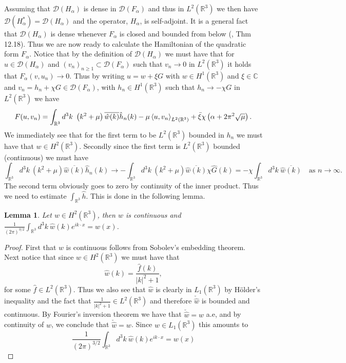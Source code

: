 \documentclass[a4paper,11pt]{article}
\newcommand{\dom}[1]{\mathscr D\left(#1\right)}
\newcommand{\R}{\mathbb{R}}
\newcommand{\C}{\mathbb{C}}
\newtheorem{lemma}{Lemma}
\numberwithin{equation}{section}
\begin{document}
Assuming that $ \dom{H_\alpha} $ is dense in $ \dom{F_\alpha} $ and thus in $ L^2(\R^3) $ we then have $ \dom{H_\alpha^*}=\dom{H_\alpha} $ and the operator, $ H_\alpha $, is self-adjoint. It is a general fact that $ \dom{H_\alpha} $ is dense whenever $ F_\alpha $ is closed and bounded from below (\cite{grubb2008distributions}, Thm 12.18). Thus we are now ready to calculate the Hamiltonian of the quadratic form $ F_\alpha $. Notice that by the definition of $ \dom{H_\alpha} $ we must have that for $ u\in\dom{H_\alpha} $ and $  (v_n)_{n\geq1}\subset\dom{F_\alpha} $  such that $ v_n\to0 $ in $ L^2(\R^3) $ it holds that  $ F_\alpha(v,u_n)\to 0 $. Thus by writing $ u=w+\xi G $ with $ w\in H^1(\R^3) $ and $ \xi\in\C $ and $ v_n=h_n+\chi G\in\dom{F_\alpha} $, with $ h_n\in H^1(\R^3) $ such that $ h_n\to-\chi G $ in $ L^2(\R^3) $ we have \begin{equation}
F(u,v_n)=\int_{\R^3} d^3k\ \left(k^2+\mu\right)\overline{\hat{w}(k)}\hat{h}_n(k)-\mu\braket{u,v_n}_{L^2(\R^3)}+\bar{\xi}\chi\left(\alpha+2\pi^2\sqrt{\mu}\right).
\end{equation}
We immediately see that for the first term to be $ L^2(\R^3) $ bounded in $ h_n $ we must have that $ w\in H^2(\R^3) $. Secondly since the first term is $ L^2(\R^3) $ bounded (continuous) we must have \begin{equation}
\int_{\R^3} d^3k\ \left(k^2+\mu\right)\overline{\hat{w}(k)}\hat{h}_n(k)\to-\int_{\R^3} d^3k\ \left(k^2+\mu\right)\overline{\hat{w}(k)}\chi \hat{G}(k)=-\chi\int_{\R^3} d^3k\ \overline{\hat{w}(k)}\quad \text{as }n\to\infty.
\end{equation} 
The second term obviously goes to zero by continuity of the inner product. Thus we need to estimate $ \int_{\R^3}\hat{h} $. This is done in the following lemma.
\begin{lemma}
	Let $ w\in H^2(\R^3) $, then $ w $ is continuous and $ \frac{1}{(2\pi)^{3/2}}\int_{\R^3}d^3k\ \hat{w}(k)e^{ik\cdot x}=w(x) $.
\end{lemma}
\begin{proof}
	First that $ w $ is continuous follows from Sobolev's embedding theorem. Next notice that since $ w\in H^2(\R^3) $ we must have that \begin{equation}
	\hat{w}(k)=\frac{\hat{f}(k)}{|k|^2+1},
	\end{equation}
	for some $ \hat{f}\in L^2(\R^3) $. Thus we also see that $ \hat{w} $ is clearly in $ L_1(\R^3) $ by H\"older's inequality and the fact that $ \frac{1}{|k|^2+1}\in L^2(\R^3) $ and therefore $ \check{\hat{w}} $ is bounded and continuous. By Fourier's inversion theorem we have that $ \check{\hat{w}}=w $ a.e, and by continuity of $ w $, we conclude that $ \check{\hat{w}}=w $. Since $ \hat{w}\in L_1(\R^3) $ this amounts to \begin{equation}
	\frac{1}{(2\pi)^{3/2}}\int_{\R^3}d^3k\ \hat{w}(k)e^{ik\cdot x}=w(x) 
	\end{equation}
\end{proof}
\end{document}
